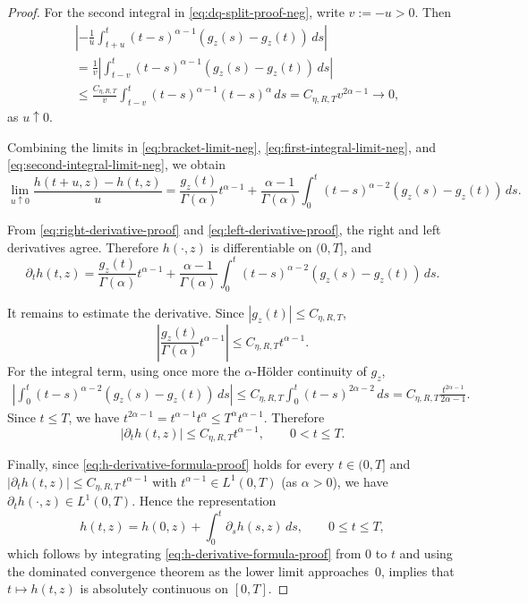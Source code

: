 \documentclass[letterpaper]{article}
\numberwithin{equation}{section}
\theoremstyle{definition}
\theoremstyle{remark}
\begin{document}
\begin{proof}
For the second integral in \eqref{eq:dq-split-proof-neg}, write $v:=-u>0$. Then
\begin{align}
  &\left|
    -\frac{1}{u}\int_{t+u}^{t}(t-s)^{\alpha-1}
    \left(g_z(s)-g_z(t)\right)\,ds
  \right|
  \nonumber\\
  &=
  \frac{1}{v}\left|
    \int_{t-v}^{t}(t-s)^{\alpha-1}
    \left(g_z(s)-g_z(t)\right)\,ds
  \right|
  \nonumber\\
  &\le
  \frac{C_{\eta,R,T}}{v}
  \int_{t-v}^{t}(t-s)^{\alpha-1}(t-s)^\alpha\,ds
 =
  C_{\eta,R,T}v^{2\alpha-1}
  \to0,
\label{eq:second-integral-limit-neg}
\end{align}
as $u\uparrow0$.

Combining the limits in \eqref{eq:bracket-limit-neg}, \eqref{eq:first-integral-limit-neg}, and \eqref{eq:second-integral-limit-neg},
we obtain
\begin{equation}
  \lim_{u\uparrow0}\frac{h(t+u,z)-h(t,z)}{u}
  =
  \frac{g_z(t)}{\Gamma(\alpha)}t^{\alpha-1}
  +
  \frac{\alpha-1}{\Gamma(\alpha)}
  \int_0^t (t-s)^{\alpha-2}\left(g_z(s)-g_z(t)\right)\,ds .
  \label{eq:left-derivative-proof}
\end{equation}

From \eqref{eq:right-derivative-proof} and \eqref{eq:left-derivative-proof}, the right and left derivatives agree. Therefore $h(\cdot,z)$ is differentiable on $(0,T]$, and
\begin{equation}\label{eq:h-derivative-formula-proof}
  \partial_t h(t,z)
  =
  \frac{g_z(t)}{\Gamma(\alpha)}t^{\alpha-1}
  +
  \frac{\alpha-1}{\Gamma(\alpha)}
  \int_0^t (t-s)^{\alpha-2}\left(g_z(s)-g_z(t)\right)\,ds .
\end{equation}

It remains to estimate the derivative. Since $|g_z(t)|\le C_{\eta,R,T}$,
\[
  \left|\frac{g_z(t)}{\Gamma(\alpha)}t^{\alpha-1}\right|
  \le C_{\eta,R,T}t^{\alpha-1}.
\]
For the integral term, using once more the $\alpha$-H\"older continuity of $g_z$,
\begin{align*}
  \left|
    \int_0^t (t-s)^{\alpha-2}\left(g_z(s)-g_z(t)\right)\,ds
  \right|
  \le
  C_{\eta,R,T}\int_0^t (t-s)^{2\alpha-2}\,ds
 =
  C_{\eta,R,T}\frac{t^{2\alpha-1}}{2\alpha-1}.
\end{align*}
Since $t\le T$, we have $t^{2\alpha-1}=t^{\alpha-1}t^\alpha\le T^\alpha t^{\alpha-1}$.
Therefore
\[
  |\partial_t h(t,z)|
  \le C_{\eta,R,T}t^{\alpha-1},
  \qquad 0<t\le T.
\]

Finally, since \eqref{eq:h-derivative-formula-proof} holds for every $t\in(0,T]$
and $|\partial_t h(t,z)|\le C_{\eta,R,T}\,t^{\alpha-1}$ with $t^{\alpha-1}\in L^1(0,T)$ (as $\alpha>0$), we have $\partial_t h(\cdot,z)\in L^1(0,T)$. Hence the representation
\[
  h(t,z)=h(0,z)+\int_0^t \partial_s h(s,z)\,ds,\qquad 0\le t\le T,
\]
which follows by integrating \eqref{eq:h-derivative-formula-proof} from $0$ to $t$ and using the dominated convergence theorem as the lower limit approaches~$0$, implies that $t\mapsto h(t,z)$ is absolutely continuous on $[0,T]$.
\end{proof}
\end{document}
